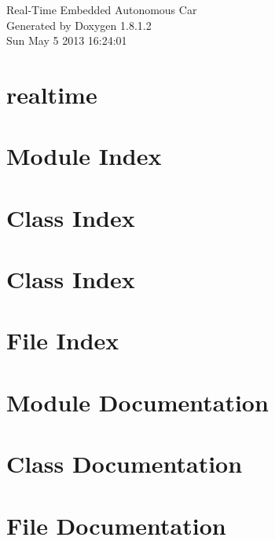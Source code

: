 \documentclass{book}
\begin{document}
\hypersetup{pageanchor=false,citecolor=blue}
\begin{titlepage}
\vspace*{7cm}
\begin{center}
{\Large Real-\/\-Time Embedded Autonomous Car }\\
\vspace*{1cm}
{\large Generated by Doxygen 1.8.1.2}\\
\vspace*{0.5cm}
{\small Sun May 5 2013 16:24:01}\\
\end{center}
\end{titlepage}
\clearemptydoublepage
{}
\tableofcontents
\clearemptydoublepage
{}
\hypersetup{pageanchor=true,citecolor=blue}
\chapter{realtime}
\label{md_README}
\hypertarget{md_README}{}

\chapter{Module Index}

\chapter{Class Index}

\chapter{Class Index}

\chapter{File Index}

\chapter{Module Documentation}







\chapter{Class Documentation}


















\chapter{File Documentation}

\printindex
\end{document}
